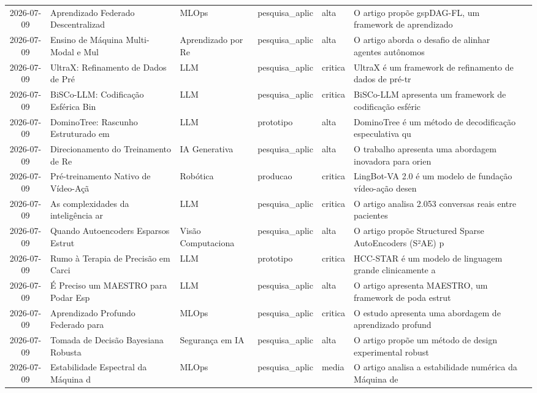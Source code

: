 \documentclass[
  brazilian,
  11pt,
  letterpaper,
  DIV=11,
  numbers=noendperiod]{scrartcl}
\begin{document}
\begin{table}
{\begin{threeparttable}
\begin{tabular}{cp{1.2cm}p{3.5cm}p{2cm}p{1.8cm}p{1.2cm}p{4cm}}
    2026-07-09 & Aprendizado Federado Descentralizad & MLOps & pesquisa\_aplic & alta & O artigo propõe gspDAG-FL, um framework de aprendizado  \\
    2026-07-09 & Ensino de Máquina Multi-Modal e Mul & Aprendizado por Re & pesquisa\_aplic & alta & O artigo aborda o desafio de alinhar agentes autônomos  \\
    2026-07-09 & UltraX: Refinamento de Dados de Pré & LLM & pesquisa\_aplic & critica & UltraX é um framework de refinamento de dados de pré-tr \\
    2026-07-09 & BiSCo-LLM: Codificação Esférica Bin & LLM & pesquisa\_aplic & critica & BiSCo-LLM apresenta um framework de codificação esféric \\
    2026-07-09 & DominoTree: Rascunho Estruturado em & LLM & prototipo & alta & DominoTree é um método de decodificação especulativa qu \\
    2026-07-09 & Direcionamento do Treinamento de Re & IA Generativa & pesquisa\_aplic & alta & O trabalho apresenta uma abordagem inovadora para orien \\
    2026-07-09 & Pré-treinamento Nativo de Vídeo-Açã & Robótica & producao & critica & LingBot-VA 2.0 é um modelo de fundação vídeo-ação desen \\
    2026-07-09 & As complexidades da inteligência ar & LLM & pesquisa\_aplic & critica & O artigo analisa 2.053 conversas reais entre pacientes  \\
    2026-07-09 & Quando Autoencoders Esparsos Estrut & Visão Computaciona & pesquisa\_aplic & alta & O artigo propõe Structured Sparse AutoEncoders (S²AE) p \\
    2026-07-09 & Rumo à Terapia de Precisão em Carci & LLM & prototipo & critica & HCC-STAR é um modelo de linguagem grande clinicamente a \\
    2026-07-09 & É Preciso um MAESTRO para Podar Esp & LLM & pesquisa\_aplic & alta & O artigo apresenta MAESTRO, um framework de poda estrut \\
    2026-07-09 & Aprendizado Profundo Federado para  & MLOps & pesquisa\_aplic & critica & O estudo apresenta uma abordagem de aprendizado profund \\
    2026-07-09 & Tomada de Decisão Bayesiana Robusta & Segurança em IA & pesquisa\_aplic & alta & O artigo propõe um método de design experimental robust \\
    2026-07-09 & Estabilidade Espectral da Máquina d & MLOps & pesquisa\_aplic & media & O artigo analisa a estabilidade numérica da Máquina de  \\

\end{tabular}
\end{threeparttable}}
\end{table}
\end{document}
